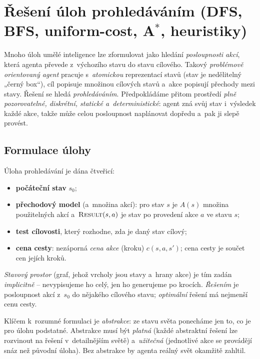 \section{\texorpdfstring{Řešení úloh prohledáváním (DFS, BFS, uniform-cost, A${}^\ast$, heuristiky)}{Řešení úloh prohledáváním (DFS, BFS, uniform-cost, A*, heuristiky)}}

Mnoho úloh umělé inteligence lze zformulovat jako hledání \emph{posloupnosti akcí}, která agenta převede z~výchozího stavu do stavu cílového. Takový \emph{problémově orientovaný agent} pracuje s~\emph{atomickou} reprezentací stavů (stav je nedělitelný „černý box``), cíl popisuje množinou cílových stavů a~akce popisují přechody mezi stavy. Řešení se hledá \emph{prohledáváním}. Předpokládáme přitom prostředí \emph{plně pozorovatelné, diskrétní, statické a~deterministické}: agent zná svůj stav i~výsledek každé akce, takže může celou posloupnost naplánovat dopředu a~pak ji slepě provést.

\subsection{Formulace úlohy}

\begin{definice}
Úloha prohledávání je dána čtveřicí:
\begin{itemize}
  \item \textbf{počáteční stav} $s_0$;
  \item \textbf{přechodový model} (a~množina akcí): pro stav $s$ je $A(s)$ množina použitelných akcí a~$\textsc{Result}(s,a)$ je stav po provedení akce $a$ ve stavu $s$;
  \item \textbf{test cílovosti}, který rozhodne, zda je daný stav cílový;
  \item \textbf{cena cesty}: nezáporná \emph{cena akce} (kroku) $c(s,a,s')$; cena cesty je součet cen jejích kroků.
\end{itemize}
\emph{Stavový prostor} (graf, jehož vrcholy jsou stavy a~hrany akce) je tím zadán \emph{implicitně} -- nevypisujeme ho celý, jen ho generujeme po krocích. \emph{Řešením} je posloupnost akcí z~$s_0$ do nějakého cílového stavu; \emph{optimální} řešení má nejmenší cenu cesty.
\end{definice}

\begin{intuice}
Klíčem k~rozumné formulaci je \emph{abstrakce}: ze stavu světa ponecháme jen to, co je pro úlohu podstatné. Abstrakce musí být \emph{platná} (každé abstraktní řešení lze rozvinout na řešení v~detailnějším světě) a~\emph{užitečná} (jednotlivé akce se provádějí snáz než původní úloha). Bez abstrakce by agenta reálný svět okamžitě zahltil.
\end{intuice}

